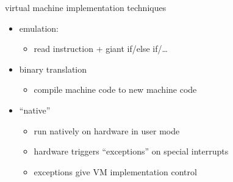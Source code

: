 \begin{frame}{virtual machine implementation techniques}
    \begin{itemize}
    \item emulation:    
        \begin{itemize}
        \item read instruction + giant if/else if/\ldots
        \end{itemize}
    \item binary translation
        \begin{itemize}
        \item compile machine code to new machine code
        \end{itemize}
    \item ``native''
        \begin{itemize}
        \item run natively on hardware in user mode
        \item hardware triggers ``exceptions'' on special interrupts
        \item exceptions give VM implementation control
        \end{itemize}
    \end{itemize}
\end{frame}

